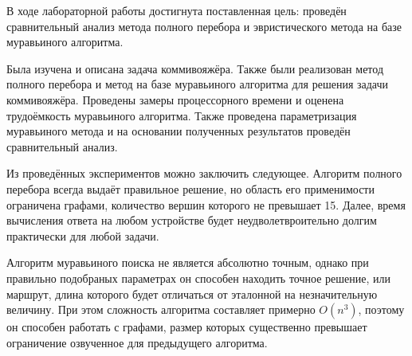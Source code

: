 В ходе лабораторной работы достигнута поставленная цель: проведён сравнительный анализ метода полного перебора и эвристического метода на базе муравьиного алгоритма.

Была изучена и описана задача коммивояжёра. Также были реализован метод полного перебора и метод на базе муравьиного алгоритма для решения задачи коммивояжёра. Проведены замеры процессорного времени и оценена трудоёмкость муравьиного алгоритма. Также проведена параметризация муравьиного метода и на основании полученных результатов проведён сравнительный анализ.

Из проведённых экспериментов можно заключить следующее. Алгоритм полного перебора всегда выдаёт правильное решение, но область его применимости ограничена графами, количество вершин которого не превышает 15. Далее, время вычисления ответа на любом устройстве будет неудволетвроительно долгим практически для любой задачи.

Алгоритм муравьиного поиска не является абсолютно точным, однако при правильно подобраных параметрах он способен находить точное решение, или маршрут, длина которого будет отличаться от эталонной на незначительную величину. При этом сложность алгоритма составляет примерно $O(n^{3})$, поэтому он способен работать с графами, размер которых существенно превышает ограничение озвученное для предыдущего алгоритма.
